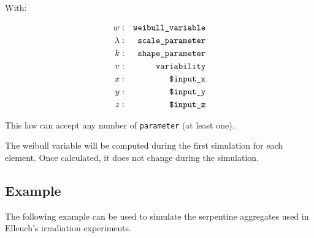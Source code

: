 \documentclass[10pt]{article}
\begin{document}
With:

\begin{eqnarray}
	w & : & \verb+weibull_variable+ \notag \\
	\lambda & : & \verb+scale_parameter+ \notag\\
	k & : & \verb+shape_parameter+ \notag\\
	v & : & \verb+variability+ \notag\\
	x & : & \verb+$input_x+ \notag \\
	y & : & \verb+$input_y+ \notag \\
	z & : & \verb+$input_z+ \notag \\
\end{eqnarray}

This law can accept any number of \verb+parameter+ (at least one).

The weibull variable will be computed during the first simulation for each element. Once calculated, it does not change during the simulation.




\subsection{Example}

The following example can be used to simulate the serpentine aggregates used in Elleuch's irradiation experiments.\\
\end{document}
